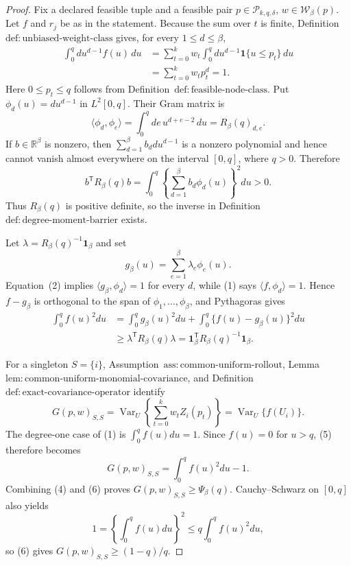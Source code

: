 \documentclass{article}
\begin{document}
\begin{proof}
Fix a declared feasible tuple and a feasible pair \(p\in\mathcal P_{k,q,\delta}\), \(w\in\mathcal W_\beta(p)\).  Let \(f\) and \(r_j\) be as in the statement.  Because the sum over \(t\) is finite, Definition~\(\mathrm{def{:}unbiased\text{-}weight\text{-}class}\) gives, for every \(1\le d\le\beta\),
\[
\begin{aligned}
\int_0^q d u^{d-1}f(u)\,du
&=\sum_{t=0}^k w_t\int_0^q d u^{d-1}\mathbf 1\{u\le p_t\}\,du\\
&=\sum_{t=0}^k w_t p_t^d=1.
\end{aligned}
\tag{1}
\]
Here \(0\le p_t\le q\) follows from Definition~\(\mathrm{def{:}feasible\text{-}node\text{-}class}\).  Put \(\phi_d(u)=d u^{d-1}\) in \(L^2[0,q]\).  Their Gram matrix is
\[
\langle\phi_d,\phi_e\rangle
=\int_0^q de\,u^{d+e-2}\,du
=R_\beta(q)_{d,e}.
\tag{2}
\]
If \(b\in\mathbb R^\beta\) is nonzero, then \(\sum_{d=1}^\beta b_d d u^{d-1}\) is a nonzero polynomial and hence cannot vanish almost everywhere on the interval \([0,q]\), where \(q>0\).  Therefore
\[
b^{\mathsf T}R_\beta(q)b
=\int_0^q\left\{\sum_{d=1}^\beta b_d\phi_d(u)\right\}^2du>0.
\tag{3}
\]
Thus \(R_\beta(q)\) is positive definite, so the inverse in Definition~\(\mathrm{def{:}degree\text{-}moment\text{-}barrier}\) exists.

Let \(\lambda=R_\beta(q)^{-1}\mathbf 1_\beta\) and set
\[
g_\beta(u)=\sum_{e=1}^\beta\lambda_e\phi_e(u).
\]
Equation~(2) implies \(\langle g_\beta,\phi_d\rangle=1\) for every \(d\), while (1) says \(\langle f,\phi_d\rangle=1\).  Hence \(f-g_\beta\) is orthogonal to the span of \(\phi_1,\ldots,\phi_\beta\), and Pythagoras gives
\[
\begin{aligned}
\int_0^q f(u)^2du
&=\int_0^q g_\beta(u)^2du
+\int_0^q\{f(u)-g_\beta(u)\}^2du\\
&\ge \lambda^{\mathsf T}R_\beta(q)\lambda
=\mathbf 1_\beta^{\mathsf T}R_\beta(q)^{-1}\mathbf 1_\beta.
\end{aligned}
\tag{4}
\]

For a singleton \(S=\{i\}\), Assumption~\(\mathrm{ass{:}common\text{-}uniform\text{-}rollout}\), Lemma~\(\mathrm{lem{:}common\text{-}uniform\text{-}monomial\text{-}covariance}\), and Definition~\(\mathrm{def{:}exact\text{-}covariance\text{-}operator}\) identify
\[
G(p,w)_{S,S}
=\operatorname{Var}_U\!\left\{\sum_{t=0}^k w_tZ_i(p_t)\right\}
=\operatorname{Var}_U\{f(U_i)\}.
\tag{5}
\]
The degree-one case of (1) is \(\int_0^qf(u)du=1\).  Since \(f(u)=0\) for \(u>q\), (5) therefore becomes
\[
G(p,w)_{S,S}=\int_0^q f(u)^2du-1.
\tag{6}
\]
Combining (4) and (6) proves \(G(p,w)_{S,S}\ge\Psi_\beta(q)\).  Cauchy--Schwarz on \([0,q]\) also yields
\[
1=\left\{\int_0^qf(u)du\right\}^2
\le q\int_0^qf(u)^2du,
\tag{7}
\]
so (6) gives \(G(p,w)_{S,S}\ge(1-q)/q\).


\end{proof}
\end{document}
